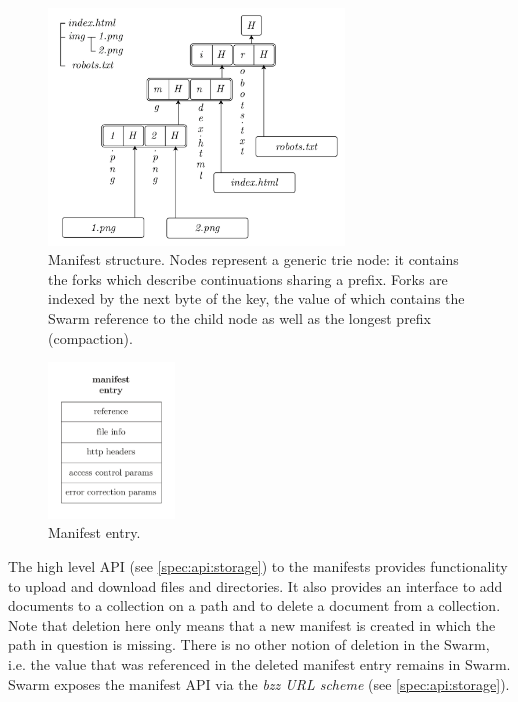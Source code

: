 \begin{figure}[htbp]
\centering
\includegraphics[width=0.7\textwidth]{fig/manifest-structure.pdf}
\caption[Manifest structure \statusgreen]{Manifest structure. Nodes represent a generic trie node: it contains the forks which describe continuations sharing a prefix. Forks are indexed by the next byte of the key, the value of which contains the Swarm reference to the child node as well as the longest prefix (compaction).}
\label{fig:manifest-structure}
\end{figure}

\begin{figure}[htbp]
\centering
\includegraphics[width=0.3\textwidth]{fig/manifest-entry.pdf}
\caption[Manifest entry \statusred]{Manifest entry.}
\label{fig:manifest-entry}
\end{figure}

The high level API (see \ref{spec:api:storage}) to the manifests provides functionality to upload and download files and directories. It also provides an interface to add documents to a collection on a path and to delete a document from a collection. Note that deletion here only means that a new manifest is created in which the path in question is missing. There is no other notion of deletion in the Swarm, i.e. the value that was referenced in the deleted manifest entry remains in Swarm. Swarm exposes the manifest API via the \emph{bzz URL scheme} (see \ref{spec:api:storage}).

